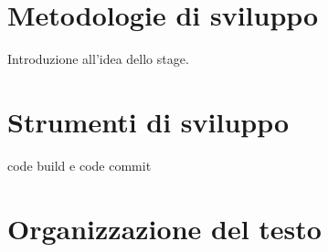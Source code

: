 \section{Metodologie di sviluppo}

Introduzione all'idea dello stage.

\section{Strumenti di sviluppo}
code build e code commit 

\section{Organizzazione del testo}

    
    
    
    
    

